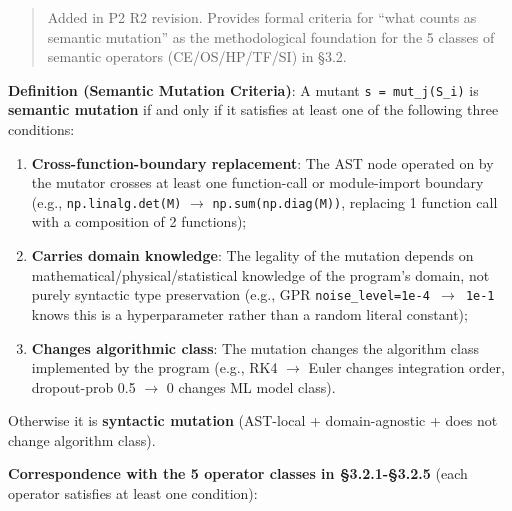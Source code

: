 \documentclass[review,12pt,authoryear]{elsarticle}
\begin{document}
\begin{quote}
Added in P2 R2 revision. Provides formal criteria for ``what counts as
semantic mutation'' as the methodological foundation for the 5 classes
of semantic operators (CE/OS/HP/TF/SI) in §3.2.
\end{quote}

\textbf{Definition (Semantic Mutation Criteria)}: A mutant
\texttt{s\textquotesingle{}\ =\ mut\_j(S\_i)} is \textbf{semantic
mutation} if and only if it satisfies at least one of the following
three conditions:

\begin{enumerate}
\def\labelenumi{(\alph{enumi})}
\item
  \textbf{Cross-function-boundary replacement}: The AST node operated on
  by the mutator crosses at least one function-call or module-import
  boundary (e.g., \texttt{np.linalg.det(M)} $\to$
  \texttt{np.sum(np.diag(M))}, replacing 1 function call with a
  composition of 2 functions);
\item
  \textbf{Carries domain knowledge}: The legality of the mutation
  depends on mathematical/physical/statistical knowledge of the
  program's domain, not purely syntactic type preservation (e.g., GPR
  \texttt{noise\_level=1e-4\ $\to$\ 1e-1} knows this is a hyperparameter
  rather than a random literal constant);
\item
  \textbf{Changes algorithmic class}: The mutation changes the algorithm
  class implemented by the program (e.g., RK4 $\to$ Euler changes
  integration order, dropout-prob 0.5 $\to$ 0 changes ML model class).
\end{enumerate}

Otherwise it is \textbf{syntactic mutation} (AST-local + domain-agnostic
+ does not change algorithm class).

\textbf{Correspondence with the 5 operator classes in §3.2.1-§3.2.5}
(each operator satisfies at least one condition):
\end{document}
